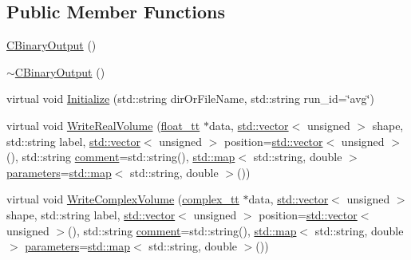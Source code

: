 \subsection*{Public Member Functions}
\begin{DoxyCompactItemize}
\item 
\hyperlink{class_q_s_t_e_m_1_1_c_binary_output_a70a221eeaf6df8090a72d20ae5bc104d}{C\-Binary\-Output} ()
\item 
\hyperlink{class_q_s_t_e_m_1_1_c_binary_output_ab20753f91b070b2ad603b82b8908456f}{$\sim$\-C\-Binary\-Output} ()
\item 
virtual void \hyperlink{class_q_s_t_e_m_1_1_c_binary_output_a7aad1e4283cdd03e0835dc35f927f6f3}{Initialize} (std\-::string dir\-Or\-File\-Name, std\-::string run\-\_\-id=\char`\"{}avg\char`\"{})
\item 
virtual void \hyperlink{class_q_s_t_e_m_1_1_c_binary_output_a4d79927ead8b30b32666fcc20c88962a}{Write\-Real\-Volume} (\hyperlink{namespace_q_s_t_e_m_a915d7caa497280d9f927c4ce8d330e47}{float\-\_\-tt} $\ast$data, \hyperlink{qmb_8m_af54b69a32590de218622e869b06b47b3}{std\-::vector}$<$ unsigned $>$ shape, std\-::string label, \hyperlink{qmb_8m_af54b69a32590de218622e869b06b47b3}{std\-::vector}$<$ unsigned $>$ position=\hyperlink{qmb_8m_af54b69a32590de218622e869b06b47b3}{std\-::vector}$<$ unsigned $>$(), std\-::string \hyperlink{image_sim_8m_aea4cc4bd8e43a7f8ebf9b0ee3da8d681}{comment}=std\-::string(), \hyperlink{_displacement_params_8m_af619c74fd72bdb64d115463dff2720cd}{std\-::map}$<$ std\-::string, double $>$ \hyperlink{sim_image_from_wave_8m_acb6d7970e73c00effe1d16e23142f11d}{parameters}=\hyperlink{_displacement_params_8m_af619c74fd72bdb64d115463dff2720cd}{std\-::map}$<$ std\-::string, double $>$())
\item 
virtual void \hyperlink{class_q_s_t_e_m_1_1_c_binary_output_a8cc530d55603a753dcd6ce1819d6d8fc}{Write\-Complex\-Volume} (\hyperlink{namespace_q_s_t_e_m_afa320ea3cd2f5ff080c422f81b803a32}{complex\-\_\-tt} $\ast$data, \hyperlink{qmb_8m_af54b69a32590de218622e869b06b47b3}{std\-::vector}$<$ unsigned $>$ shape, std\-::string label, \hyperlink{qmb_8m_af54b69a32590de218622e869b06b47b3}{std\-::vector}$<$ unsigned $>$ position=\hyperlink{qmb_8m_af54b69a32590de218622e869b06b47b3}{std\-::vector}$<$ unsigned $>$(), std\-::string \hyperlink{image_sim_8m_aea4cc4bd8e43a7f8ebf9b0ee3da8d681}{comment}=std\-::string(), \hyperlink{_displacement_params_8m_af619c74fd72bdb64d115463dff2720cd}{std\-::map}$<$ std\-::string, double $>$ \hyperlink{sim_image_from_wave_8m_acb6d7970e73c00effe1d16e23142f11d}{parameters}=\hyperlink{_displacement_params_8m_af619c74fd72bdb64d115463dff2720cd}{std\-::map}$<$ std\-::string, double $>$())

\end{DoxyCompactItemize}
